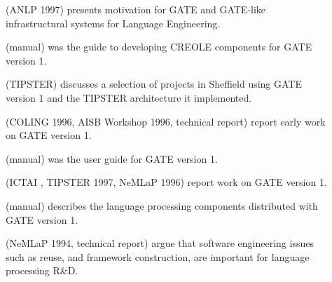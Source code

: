 \begin{description}
%
\item[\cite{Cun97a}] (ANLP 1997)
presents motivation for GATE and GATE-like infrastructural systems for
Language Engineering.
%
\item[\cite{Cun96g}] (manual)
was the guide to developing CREOLE components for GATE version 1.
%
\item[\cite{Cun96h}] (TIPSTER)
discusses a selection of projects in Sheffield using GATE version 1 and the
TIPSTER architecture it implemented.
%
\item[\cite{Cun96b,Cun96,Cun95}] (COLING 1996, AISB Workshop 1996,
technical report) report early work on GATE version 1.
%
\item[\cite{Gai96d}] (manual)
was the user guide for GATE version 1.
%
\item[\cite{Gai96b,Cun97e,Cun96c}] (ICTAI , TIPSTER 1997, NeMLaP 1996)
report work on GATE version 1.
%
\item[\cite{Hum96}] (manual)
describes the language processing components distributed with GATE version 1.
%
\item[\cite{Cun94a,Cun94}] (NeMLaP 1994, technical report)
argue that software engineering issues such as reuse, and framework
construction, are important for language processing R\&D.
%
\end{description}
%
\fi
